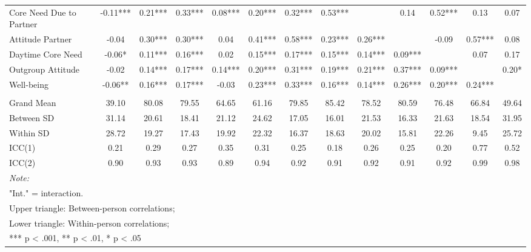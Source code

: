\begin{sidewaystable*}[!hbtp]
{\begin{tabular}[t]{lcccccccccccc}
\hspace{1em}Core Need Due to Partner & -0.11*** & 0.21*** & 0.33*** & 0.08*** & 0.20*** & 0.32*** & 0.53*** &  & 0.14 & 0.52*** & 0.13 & 0.07\\
\hspace{1em}Attitude Partner & -0.04 & 0.30*** & 0.30*** & 0.04 & 0.41*** & 0.58*** & 0.23*** & 0.26*** &  & -0.09 & 0.57*** & 0.08\\
\hspace{1em}Daytime Core Need & -0.06* & 0.11*** & 0.16*** & 0.02 & 0.15*** & 0.17*** & 0.15*** & 0.14*** & 0.09*** &  & 0.07 & 0.17\\
\hspace{1em}Outgroup Attitude & -0.02 & 0.14*** & 0.17*** & 0.14*** & 0.20*** & 0.31*** & 0.19*** & 0.21*** & 0.37*** & 0.09*** &  & 0.20*\\
\hspace{1em}Well-being & -0.06** & 0.16*** & 0.17*** & -0.03 & 0.23*** & 0.33*** & 0.16*** & 0.14*** & 0.26*** & 0.20*** & 0.24*** & \\
\addlinespace[0.3em]
\multicolumn{13}{l}{\textbf{Descriptives}}\\
\hspace{1em}Grand Mean & 39.10 & 80.08 & 79.55 & 64.65 & 61.16 & 79.85 & 85.42 & 78.52 & 80.59 & 76.48 & 66.84 & 49.64\\
\hspace{1em}Between SD & 31.14 & 20.61 & 18.41 & 21.12 & 24.62 & 17.05 & 16.01 & 21.53 & 16.33 & 21.63 & 18.54 & 31.95\\
\hspace{1em}Within SD & 28.72 & 19.27 & 17.43 & 19.92 & 22.32 & 16.37 & 18.63 & 20.02 & 15.81 & 22.26 & 9.45 & 25.72\\
\hspace{1em}ICC(1) & 0.21 & 0.29 & 0.27 & 0.35 & 0.31 & 0.25 & 0.18 & 0.26 & 0.25 & 0.20 & 0.77 & 0.52\\
\hspace{1em}ICC(2) & 0.90 & 0.93 & 0.93 & 0.89 & 0.94 & 0.92 & 0.91 & 0.92 & 0.91 & 0.92 & 0.99 & 0.98\\
\bottomrule
\multicolumn{13}{l}{\rule{0pt}{1em}\textit{Note: }}\\
\multicolumn{13}{l}{\rule{0pt}{1em}"Int." = interaction.}\\
\multicolumn{13}{l}{\rule{0pt}{1em}Upper triangle: Between-person correlations;}\\
\multicolumn{13}{l}{\rule{0pt}{1em}Lower triangle: Within-person correlations;}\\
\multicolumn{13}{l}{\rule{0pt}{1em}*** p < .001, ** p < .01,  * p < .05}\\
\end{tabular}}
\end{sidewaystable*}
